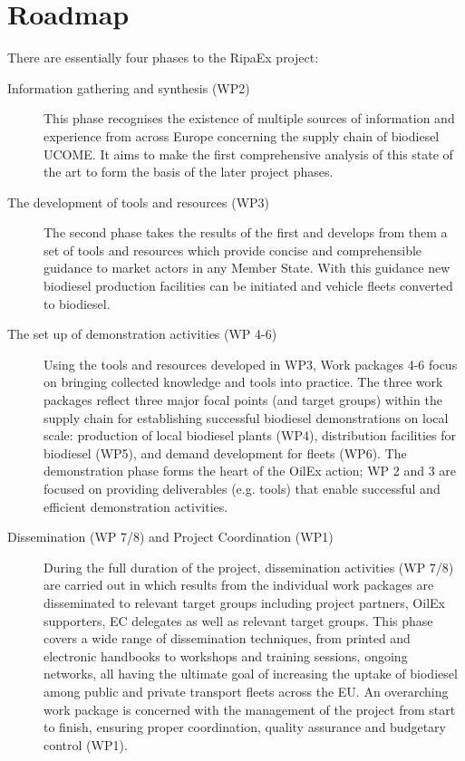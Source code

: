 \documentclass[11pt,fleqn]{book} %
\begin{document}

\section{Roadmap}
\lipsum[1-2]

There are essentially four phases to the RipaEx project:
\begin{description}
	\item[Information gathering and synthesis (WP2)] This phase recognises the existence of multiple sources of information and experience from
    across Europe concerning the supply chain of biodiesel UCOME. It aims to make the first
    comprehensive analysis of this state of the art to form the basis of the later project phases.    
	\item[The development of tools and resources (WP3)] The second phase takes the results of the first and develops from them a set of tools and
    resources which provide concise and comprehensible guidance to market actors in any
    Member State. With this guidance new biodiesel production facilities can be initiated and
    vehicle fleets converted to biodiesel.    
    \item[The set up of demonstration activities (WP 4-6)] Using the tools and resources developed in WP3, Work packages 4-6 focus on bringing
    collected knowledge and tools into practice. The three work packages reflect three major
    focal points (and target groups) within the supply chain for establishing successful biodiesel
    demonstrations on local scale: production of local biodiesel plants (WP4), distribution
    facilities for biodiesel (WP5), and demand development for fleets (WP6). The demonstration
    phase forms the heart of the OilEx action; WP 2 and 3 are focused on providing
    deliverables (e.g. tools) that enable successful and efficient demonstration activities.    
    \item[Dissemination (WP 7/8) and Project Coordination (WP1)] During the full duration of the project, dissemination activities (WP 7/8) are carried out in
    which results from the individual work packages are disseminated to relevant target groups
    including project partners, OilEx supporters, EC delegates as well as relevant target
    groups. This phase covers a wide range of dissemination techniques, from printed and
    electronic handbooks to workshops and training sessions, ongoing networks, all having the
    ultimate goal of increasing the uptake of biodiesel among public and private transport fleets
    across the EU. An overarching work package is concerned with the management of the
    project from start to finish, ensuring proper coordination, quality assurance and budgetary
    control (WP1).
\end{description}
\end{document}
